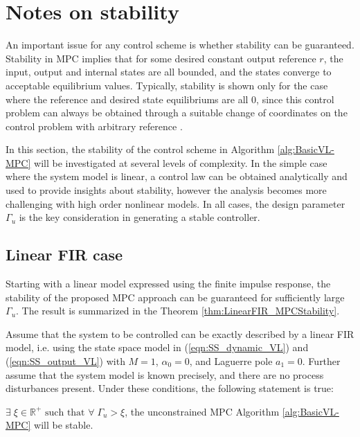 \section{Notes on stability}

An important issue for any control scheme is whether stability can be guaranteed. Stability in MPC implies that for some desired constant output reference $r$, the input, output and internal states are all bounded, and the states converge to acceptable equilibrium values. Typically, stability is shown only for the case where the reference and desired state equilibriums are all 0, since this control problem can always be obtained through a suitable change of coordinates on the control problem with arbitrary reference \cite{Mayne2000}.  

In this section, the stability of the control scheme in Algorithm \ref{alg:BasicVL-MPC} will be investigated at several levels of complexity. In the simple case where the system model is linear, a control law can be obtained analytically and used to provide insights about stability, however the analysis becomes more challenging with high order nonlinear models. In all cases, the design parameter $\Gamma_u$ is the key consideration in generating a stable controller.

\subsection{Linear FIR case}

Starting with a linear model expressed using the finite impulse response, the stability of the proposed MPC approach can be guaranteed for sufficiently large $\Gamma_u$. The result is summarized in the Theorem \ref{thm:LinearFIR_MPCStability}.

\begin{thm}
Assume that the system to be controlled can be exactly described by a linear FIR model, i.e. using the state space model in (\ref{eqn:SS_dynamic_VL}) and (\ref{eqn:SS_output_VL}) with $M=1$, $\alpha_0 = 0$, and Laguerre pole $a_1 = 0$. Further assume that the system model is known precisely, and there are no process disturbances present. Under these conditions, the following statement is true:

$\exists \; \xi \in \mathbb{R}^+ \textrm{ such that } \forall \; \Gamma_u > \xi$, the unconstrained MPC Algorithm \ref{alg:BasicVL-MPC} will be stable.

\label{thm:LinearFIR_MPCStability}
\end{thm}

